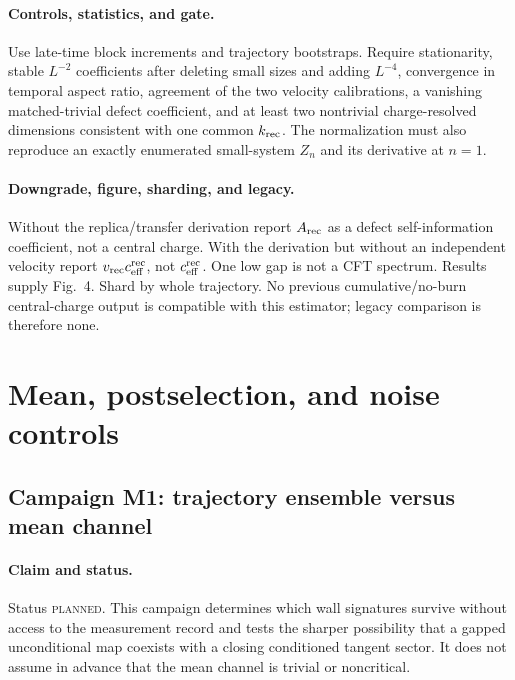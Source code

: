\documentclass[aps,prx,onecolumn,nofootinbib,superscriptaddress,longbibliography]{revtex4-2}
\newcommand{\planned}{\textsc{planned}}
\begin{document}
\paragraph{Controls, statistics, and gate.}
Use late-time block increments and trajectory bootstraps.  Require stationarity, stable
$L^{-2}$ coefficients after deleting small sizes and adding $L^{-4}$, convergence in
temporal aspect ratio, agreement of the two velocity calibrations, a vanishing
matched-trivial defect coefficient, and at least two nontrivial charge-resolved dimensions
consistent with one common $k_{\rm rec}$.  The normalization must also reproduce an exactly
enumerated small-system $Z_n$ and its derivative at $n=1$.

\paragraph{Downgrade, figure, sharding, and legacy.}
Without the replica/transfer derivation report $A_{\rm rec}$ as a defect
self-information coefficient, not a central charge.  With the derivation but without an
independent velocity report $v_{\rm rec}c_{\rm eff}^{\rm rec}$, not
$c_{\rm eff}^{\rm rec}$.  One low gap is not a CFT spectrum.  Results supply Fig.~4.  Shard by whole
trajectory.  No previous cumulative/no-burn central-charge output is compatible with this
estimator; legacy comparison is therefore none.

\section{Mean, postselection, and noise controls}

\subsection{Campaign M1: trajectory ensemble versus mean channel}
\paragraph{Claim and status.}
Status \planned.  This campaign determines which wall signatures survive without access to
the measurement record and tests the sharper possibility that a gapped unconditional map
coexists with a closing conditioned tangent sector.  It does not assume in advance that
the mean channel is trivial or noncritical.
\end{document}
